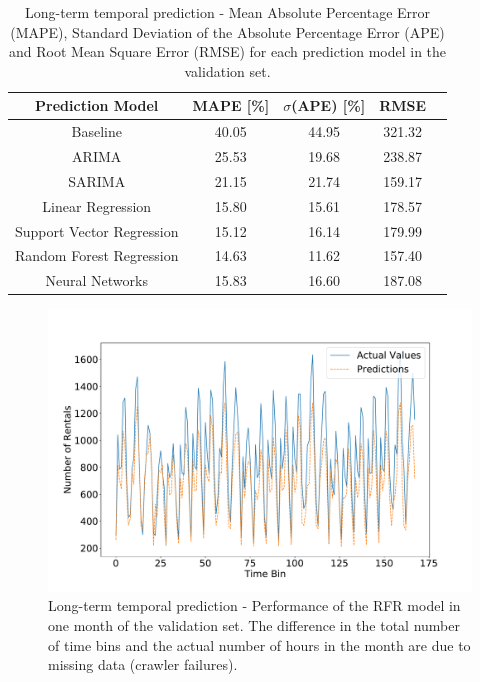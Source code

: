 \begin{table}
 \centering
  \begin{tabular}{ccccl}
  \toprule
    \textbf{Prediction Model} & \textbf{MAPE [\%]} & \textbf{$\sigma$(APE) [\%]} & \textbf{RMSE}\\
    \midrule
    Baseline                   &  40.05 &  44.95 & 321.32 \\
    ARIMA                      &  25.53 &  19.68 & 238.87 \\
    SARIMA                     &  21.15 &  21.74 & 159.17 \\
    Linear Regression          &  15.80 &  15.61 & 178.57 \\
    Support Vector Regression  &  15.12 &  16.14 & 179.99 \\
    Random Forest Regression   &  14.63 &  11.62 & 157.40 \\
    Neural Networks            &  15.83 &  16.60 & 187.08 \\
  \bottomrule
\end{tabular}
\caption{Long-term temporal prediction - Mean Absolute Percentage Error (MAPE), Standard Deviation of the Absolute Percentage Error (APE) and Root Mean Square Error (RMSE) for each prediction model in the validation set.}
\label{tab:results-stationary-models}
\end{table}

\begin{figure}
    \begin{center}
            \includegraphics[width=0.65\columnwidth]{figures/temporal_analyses/RandomForestStationaryPredictions.pdf}
        \caption{Long-term temporal prediction - Performance of the RFR model in one month of the validation set. The difference in the total number of time bins and the actual number of hours in the month are due to missing data (crawler failures).}
        \label{fig:random-forests-stationary}
    \end{center}
\end{figure}


